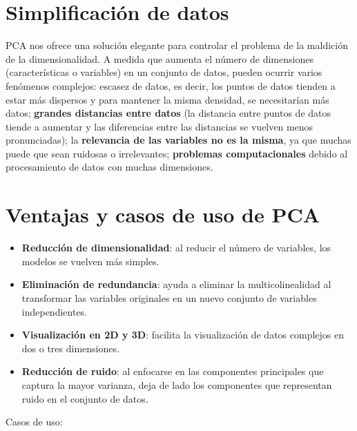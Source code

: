 \section{Simplificación de datos}

PCA nos ofrece una solución elegante para controlar el problema de la maldición de la dimensionalidad. A medida que aumenta el número de dimensiones (características o variables) en un conjunto de datos, pueden ocurrir varios fenómenos complejos: escasez de datos, es decir, los puntos de datos tienden a estar más dispersos y para mantener la misma densidad, se necesitarían más datos; \textbf{grandes distancias entre datos} (la distancia entre puntos de datos tiende a aumentar y las diferencias entre las distancias se vuelven menos pronunciadas); la\textbf{ relevancia de las variables no es la misma}, ya que muchas puede que sean ruidosas o irrelevantes; \textbf{problemas computacionales} debido al procesamiento de datos con muchas dimensiones.


\section{Ventajas y casos de uso de PCA}
\begin{itemize}
    \item \textbf{Reducción de dimensionalidad}: al reducir el número de variables, los modelos se vuelven más simples.

    \item \textbf{Eliminación de redundancia}: ayuda a eliminar la multicolinealidad al transformar las variables originales en un nuevo conjunto de variables independientes.

    \item \textbf{Visualización en 2D y 3D}: facilita la visualización de datos complejos en dos o tres dimensiones.

    \item \textbf{Reducción de ruido}: al enfocarse en las componentes principales que captura la mayor varianza, deja de lado los componentes que representan ruido en el conjunto de datos.
\end{itemize}

Casos de uso:

